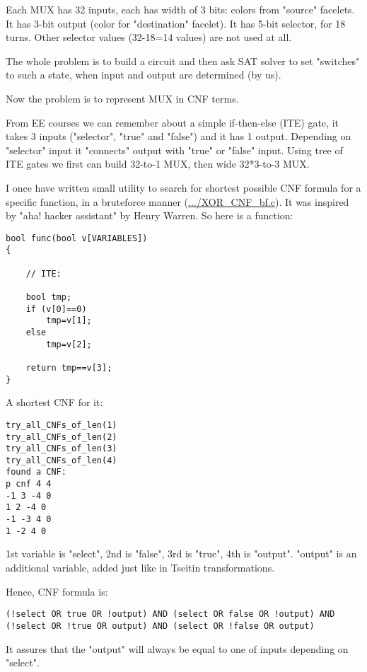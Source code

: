 Each MUX has 32 inputs, each has width of 3 bits: colors from "source" facelets.
It has 3-bit output (color for "destination" facelet).
It has 5-bit selector, for 18 turns. Other selector values (32-18=14 values) are not used at all.

The whole problem is to build a circuit and then ask SAT solver to set "switches" to such a state,
when input and output are determined (by us).

Now the problem is to represent MUX in CNF terms.

From \ac{EE} courses we can remember about a simple if-then-else (ITE) gate, it takes 3 inputs
("selector", "true" and "false") and it has 1 output.
Depending on "selector" input it "connects" output with "true" or "false" input.
Using tree of ITE gates we first can build 32-to-1 MUX, then wide 32*3-to-3 MUX.

I once have written small utility to search for shortest possible CNF formula for a specific function,
in a bruteforce manner (\url{.../XOR_CNF_bf.c}).
It was inspired by "aha! hacker assistant" by Henry Warren.
So here is a function:

\begin{lstlisting}
bool func(bool v[VARIABLES])
{

	// ITE:

	bool tmp;
	if (v[0]==0)
		tmp=v[1];
	else
		tmp=v[2];

	return tmp==v[3];
}
\end{lstlisting}

A shortest CNF for it:

\begin{lstlisting}
try_all_CNFs_of_len(1)
try_all_CNFs_of_len(2)
try_all_CNFs_of_len(3)
try_all_CNFs_of_len(4)
found a CNF:
p cnf 4 4
-1 3 -4 0
1 2 -4 0
-1 -3 4 0
1 -2 4 0
\end{lstlisting}

1st variable is "select", 2nd is "false", 3rd is "true", 4th is "output".
"output" is an additional variable, added just like in Tseitin transformations.

Hence, CNF formula is:

\begin{lstlisting}
(!select OR true OR !output) AND (select OR false OR !output) AND (!select OR !true OR output) AND (select OR !false OR output)
\end{lstlisting}

It assures that the "output" will always be equal to one of inputs depending on "select".


